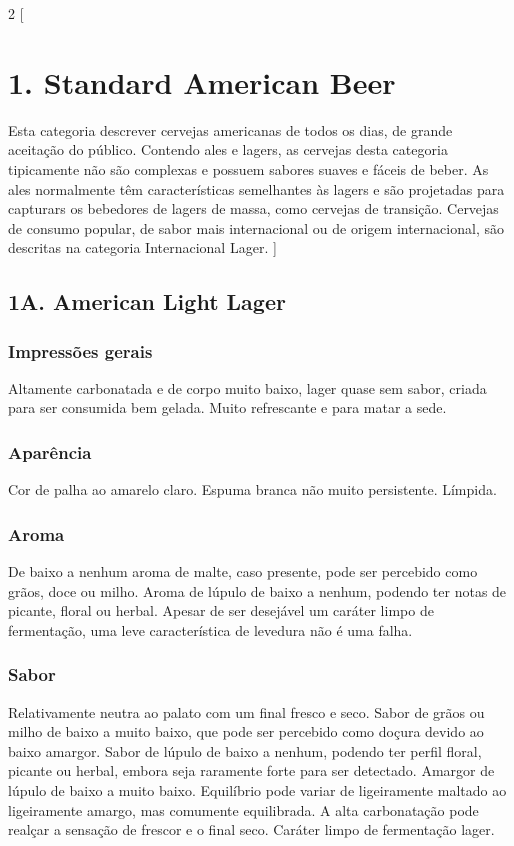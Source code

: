 \begin{multicols}{2}
[
\section*{1. Standard American Beer}
Esta categoria descrever cervejas americanas de todos os dias, de grande aceitação do público. Contendo ales e lagers, as cervejas desta categoria tipicamente não são complexas e possuem sabores suaves e fáceis de beber. As ales normalmente têm características semelhantes às lagers e são projetadas para capturars os bebedores de lagers de massa, como cervejas de transição. Cervejas de consumo popular, de sabor mais internacional ou de origem internacional, são descritas na categoria Internacional Lager.
]

\subsection*{1A. American Light Lager}

\subsubsection*{Impressões gerais}
Altamente carbonatada e de corpo muito baixo, lager quase sem sabor, criada para ser consumida bem gelada. Muito refrescante e para matar a sede.

\subsubsection*{Aparência}

Cor de palha ao amarelo claro. Espuma branca não muito persistente. Límpida.

\subsubsection*{Aroma}

De baixo a nenhum aroma de malte, caso presente, pode ser percebido como grãos, doce ou milho. Aroma de lúpulo de baixo a nenhum, podendo ter notas de picante, floral ou herbal. Apesar de ser desejável um caráter limpo de fermentação, uma leve característica de levedura não é uma falha.

\subsubsection*{Sabor}

Relativamente neutra ao palato com um final fresco e seco. Sabor de grãos ou milho de baixo a muito baixo, que pode ser percebido como doçura devido ao baixo amargor. Sabor de lúpulo de baixo a nenhum, podendo ter perfil floral, picante ou herbal, embora seja raramente forte para ser detectado. Amargor de lúpulo de baixo a muito baixo. Equilíbrio pode variar de ligeiramente maltado ao ligeiramente amargo, mas comumente equilibrada. A alta carbonatação pode realçar a sensação de frescor e o final seco. Caráter limpo de fermentação lager.


\end{multicols}
